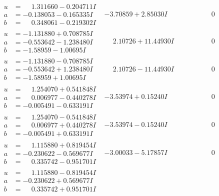 \documentclass[1p]{elsarticle_modified}
\theoremstyle{definition}
\begin{document}
$$\begin{array}{c|c|c}
\begin{aligned}
u &= \phantom{-}1.311660 - 0.204711 I \\
a &= -0.138053 - 0.165335 I \\
b &= \phantom{-}0.348061 - 0.219302 I\end{aligned}
 & -3.70859 + 2.85030 I & \phantom{-0.000000 } 0 \\ \hline\begin{aligned}
u &= -1.131880 + 0.708785 I \\
a &= -0.553642 - 1.238480 I \\
b &= -1.58959 - 1.00695 I\end{aligned}
 & \phantom{-}2.10726 + 11.44930 I & \phantom{-0.000000 } 0 \\ \hline\begin{aligned}
u &= -1.131880 - 0.708785 I \\
a &= -0.553642 + 1.238480 I \\
b &= -1.58959 + 1.00695 I\end{aligned}
 & \phantom{-}2.10726 - 11.44930 I & \phantom{-0.000000 } 0 \\ \hline\begin{aligned}
u &= \phantom{-}1.254070 + 0.541848 I \\
a &= \phantom{-}0.006977 - 0.440278 I \\
b &= -0.005491 - 0.633191 I\end{aligned}
 & -3.53974 + 0.15240 I & \phantom{-0.000000 } 0 \\ \hline\begin{aligned}
u &= \phantom{-}1.254070 - 0.541848 I \\
a &= \phantom{-}0.006977 + 0.440278 I \\
b &= -0.005491 + 0.633191 I\end{aligned}
 & -3.53974 - 0.15240 I & \phantom{-0.000000 } 0 \\ \hline\begin{aligned}
u &= \phantom{-}1.115880 + 0.819454 I \\
a &= -0.230622 - 0.569677 I \\
b &= \phantom{-}0.335742 - 0.951701 I\end{aligned}
 & -3.00033 - 5.17857 I & \phantom{-0.000000 } 0 \\ \hline\begin{aligned}
u &= \phantom{-}1.115880 - 0.819454 I \\
a &= -0.230622 + 0.569677 I \\
b &= \phantom{-}0.335742 + 0.951701 I\end{aligned}

\end{array}$$
\end{document}
